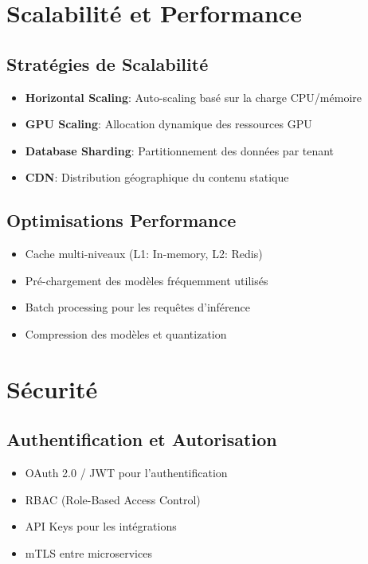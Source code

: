 \documentclass[12pt,a4paper]{article}
\begin{document}
\section{Scalabilité et Performance}

\subsection{Stratégies de Scalabilité}
\begin{itemize}
    \item \textbf{Horizontal Scaling}: Auto-scaling basé sur la charge CPU/mémoire
    \item \textbf{GPU Scaling}: Allocation dynamique des ressources GPU
    \item \textbf{Database Sharding}: Partitionnement des données par tenant
    \item \textbf{CDN}: Distribution géographique du contenu statique
\end{itemize}

\subsection{Optimisations Performance}
\begin{itemize}
    \item Cache multi-niveaux (L1: In-memory, L2: Redis)
    \item Pré-chargement des modèles fréquemment utilisés
    \item Batch processing pour les requêtes d'inférence
    \item Compression des modèles et quantization
\end{itemize}

\section{Sécurité}

\subsection{Authentification et Autorisation}
\begin{itemize}
    \item OAuth 2.0 / JWT pour l'authentification
    \item RBAC (Role-Based Access Control)
    \item API Keys pour les intégrations
    \item mTLS entre microservices
\end{itemize}
\end{document}
